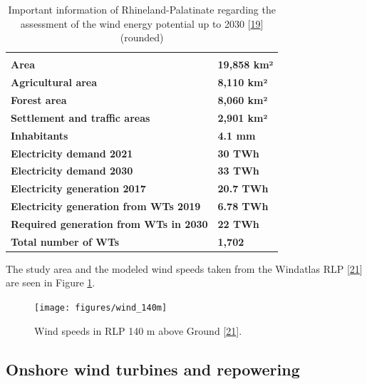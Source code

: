 \documentclass[a4paper,11pt]{article}
\begin{document}
\begin{table}[H]

\caption{\label{tab:table0}Important information of Rhineland-Palatinate regarding the assessment of the wind energy potential up to 2030 {[}\protect\hyperlink{ref-StateStatisticalOfficeofRhinelandPalatinate.2020}{19}{]} (rounded)}
\centering
\begin{tabular}[t]{>{\raggedright\arraybackslash}p{9cm}>{\raggedright\arraybackslash}p{3cm}}
\toprule
\multicolumn{1}{c}{\textbf{Basic information on Rhineland-Palatinate}} \\
\cmidrule(l{3pt}r{3pt}){1-1}
\textbf{Area} & \textbf{19,858 km²}\\
\midrule
\textbf{Agricultural area} & \textbf{8,110 km²}\\
\midrule
\textbf{Forest area} & \textbf{8,060 km²}\\
\midrule
\textbf{Settlement and traffic areas} & \textbf{2,901 km²}\\
\midrule
\textbf{Inhabitants} & \textbf{4.1 mm}\\
\midrule
\addlinespace
\textbf{Electricity demand 2021} & \textbf{30 TWh}\\
\midrule
\textbf{Electricity demand 2030} & \textbf{33 TWh}\\
\midrule
\textbf{Electricity generation 2017} & \textbf{20.7 TWh}\\
\midrule
\textbf{Electricity generation from WTs 2019} & \textbf{6.78 TWh}\\
\midrule
\textbf{Required generation from WTs in 2030} & \textbf{22 TWh}\\
\midrule
\addlinespace
\textbf{Total number of WTs} & \textbf{1,702}\\
\midrule
\bottomrule
\end{tabular}
\end{table}
The study area and the modeled wind speeds taken from the Windatlas RLP {[}\protect\hyperlink{ref-MinisteriumfurWirtschaftKlimaschutzEnergieundLandesplanung.2013}{21}{]} are seen in Figure \ref{fig:wind}.


\begin{figure}[H]

{\centering \texttt{[image: figures/wind\_140m]} 

}

\caption{Wind speeds in RLP 140 m above Ground {[}\protect\hyperlink{ref-MinisteriumfurWirtschaftKlimaschutzEnergieundLandesplanung.2013}{21}{]}.}\label{fig:wind}
\end{figure}
\hypertarget{onshore-wind-turbines-and-repowering}{%
\subsection{Onshore wind turbines and repowering}\label{onshore-wind-turbines-and-repowering}}
\end{document}
